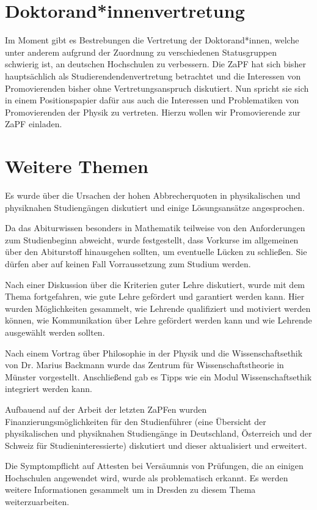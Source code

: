 \section*{Doktorand*innenvertretung}
Im Moment gibt es Bestrebungen die  Vertretung der Doktorand*innen, 
welche unter anderem aufgrund der Zuordnung zu verschiedenen Statusgruppen schwierig ist, 
an deutschen Hochschulen zu verbessern.  Die ZaPF hat sich bisher hauptsächlich als Studierendendenvertretung 
betrachtet und die Interessen von Promovierenden bisher ohne Vertretungsanspruch diskutiert. 
Nun spricht sie sich in einem Positionspapier dafür aus auch die Interessen 
und Problematiken von Promovierenden der Physik zu vertreten. 
Hierzu wollen wir Promovierende zur ZaPF einladen.



\section*{Weitere Themen}

Es wurde über die Ursachen der hohen Abbrecherquoten in physikalischen und 
physiknahen Studiengängen diskutiert und einige Lösungsansätze angesprochen.

Da das Abiturwissen besonders in Mathematik teilweise von den Anforderungen 
zum Studienbeginn abweicht, wurde festgestellt, dass Vorkurse im allgemeinen 
über den Abiturstoff hinausgehen sollten, um eventuelle Lücken zu schließen. 
Sie dürfen aber auf keinen Fall Vorraussetzung zum Studium werden.

Nach einer Diskussion über die Kriterien guter Lehre diskutiert, wurde mit dem 
Thema fortgefahren, wie gute Lehre gefördert und garantiert werden kann. 
Hier wurden Möglichkeiten gesammelt, wie Lehrende qualifiziert und motiviert werden können, 
wie Kommunikation über Lehre gefördert werden kann und wie Lehrende ausgewählt werden sollten.

Nach einem Vortrag über Philosophie in der Physik und die Wissenschaftsethik von Dr. Marius
Backmann wurde das Zentrum für Wissenschaftstheorie in Münster
vorgestellt. Anschließend gab es Tipps wie ein Modul Wissenschaftsethik integriert werden kann.

Aufbauend auf der Arbeit der letzten ZaPFen wurden Finanzierungsmöglichkeiten für den 
Studienführer (eine Übersicht der physikalischen und physiknahen Studiengänge in 
Deutschland, Österreich und der Schweiz für Studieninteressierte) diskutiert und dieser aktualisiert und erweitert.

Die Symptompflicht auf Attesten bei Versäumnis von Prüfungen, die an einigen Hochschulen  
angewendet wird, wurde als problematisch erkannt. Es werden weitere Informationen gesammelt um in Dresden zu diesem Thema weiterzuarbeiten.

